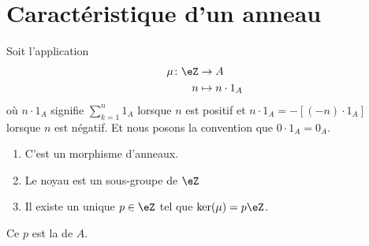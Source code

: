 \section{Caractéristique d'un anneau}


\begin{lemmaDef}        \label{LEMDEFooVEWZooUrPaDw}
	Soit l'application
	\begin{equation}
		\begin{aligned}
			\mu\colon \eZ & \to A              \\
			n             & \mapsto n\cdot 1_A
		\end{aligned}
	\end{equation}
	où \( n\cdot 1_A\) signifie \( \sum_{k=1}^n1_A\) lorsque \( n\) est positif et \( n\cdot 1_A=-[(-n)\cdot 1_A]\) lorsque \( n\) est négatif. Et nous posons la convention que \( 0\cdot 1_A=0_A\).
	\begin{enumerate}
		\item	\label{ITEMooPBWYooAWaCKJ}
		      C'est un morphisme d'anneaux.
		\item	\label{ITEMooOQWMooFYcmFf}
		      Le noyau est un sous-groupe de \( \eZ\)
		\item	\label{ITEMooWDWEooMSMxfN}
		      Il existe un unique \( p\in \eZ\) tel que \( \ker(\mu)=p\eZ\).
	\end{enumerate}
	Ce \( p\) est la  de \( A\).
\end{lemmaDef}

